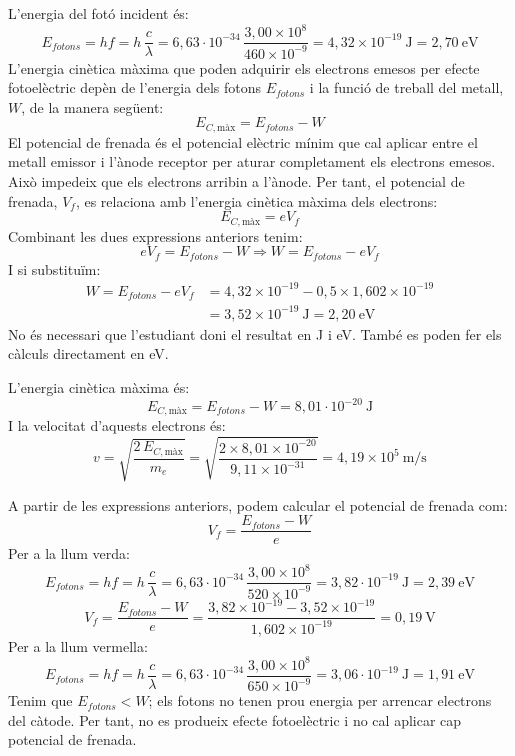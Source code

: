 \begin{solapartat}
 L'energia del fotó incident és:
\[ E_{fotons} = hf = h\,\frac{c}{\lambda} = 6,63\cdot 10^{-34}\,\frac{3,00\times 10^{8}}{460\times 10^{-9}} = 4,32\times 10^{-19}\ \mathrm{J} = 2,70\ \mathrm{eV} \]
 L'energia cinètica màxima que poden adquirir els electrons emesos per efecte fotoelèctric depèn de l'energia dels fotons $E_{fotons}$ i la funció de treball del metall, $W$, de la manera següent:
\[ E_{C,\text{màx}} = E_{fotons} - W \]
El potencial de frenada és el potencial elèctric mínim que cal aplicar entre el metall emissor i l'ànode receptor per aturar completament els electrons emesos. Això impedeix que els electrons arribin a l'ànode. Per tant, el potencial de frenada, $V_f$, es relaciona amb l'energia cinètica màxima dels electrons:
\[ E_{C,\text{màx}} = eV_f \]
Combinant les dues expressions anteriors tenim:
\[ eV_f = E_{fotons} - W \Longrightarrow W = E_{fotons} - eV_f \]
I si substituïm:
\begin{align*}
W = E_{fotons} - eV_f &= 4,32\times 10^{-19} - 0,5\times 1,602\times 10^{-19}\\
&= 3,52\times 10^{-19}\ \mathrm{J} = 2,20\ \mathrm{eV}
\end{align*}
No és necessari que l'estudiant doni el resultat en J i eV. També es poden fer els càlculs directament en eV.

\medskip
{} L'energia cinètica màxima és:
\[ E_{C,\text{màx}} = E_{fotons} - W = 8,01\cdot 10^{-20}\ \mathrm{J} \]
I la velocitat d'aquests electrons és:
\[ v = \sqrt{\frac{2\,E_{C,\text{màx}}}{m_e}} = \sqrt{\frac{2\times 8,01\times 10^{-20}}{9,11\times 10^{-31}}} = 4,19\times 10^{5}\ \mathrm{m/s} \]
\end{solapartat}

\begin{solapartat}
 A partir de les expressions anteriors, podem calcular el potencial de frenada com:
\[ V_f = \frac{E_{fotons} - W}{e} \]
 Per a la llum verda:
\[ E_{fotons} = hf = h\,\frac{c}{\lambda} = 6,63\cdot 10^{-34}\,\frac{3,00\times 10^{8}}{520\times 10^{-9}} = 3,82\cdot 10^{-19}\ \mathrm{J} = 2,39\ \mathrm{eV} \]
\[ V_f = \frac{E_{fotons} - W}{e} = \frac{3,82\times 10^{-19} - 3,52\times 10^{-19}}{1,602\times 10^{-19}} = 0,19\ \mathrm{V} \]
 Per a la llum vermella:
\[ E_{fotons} = hf = h\,\frac{c}{\lambda} = 6,63\cdot 10^{-34}\,\frac{3,00\times 10^{8}}{650\times 10^{-9}} = 3,06\cdot 10^{-19}\ \mathrm{J} = 1,91\ \mathrm{eV} \]
Tenim que $E_{fotons} < W$; els fotons no tenen prou energia per arrencar electrons del càtode. Per tant, no es produeix efecte fotoelèctric i no cal aplicar cap potencial de frenada.
\end{solapartat}
